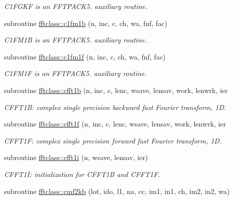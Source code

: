 \begin{DoxyCompactItemize}
\begin{DoxyCompactList}\small\item\em C1\+F\+G\+KF is an F\+F\+T\+P\+A\+C\+K5. auxiliary routine. \end{DoxyCompactList}\item 
subroutine \mbox{\hyperlink{namespacefftclass_a2f5368919279e1986ee34764caa05fe0}{fftclass\+::c1fm1b}} (n, inc, c, ch, wa, fnf, fac)
\begin{DoxyCompactList}\small\item\em C1\+F\+M1B is an F\+F\+T\+P\+A\+C\+K5. auxiliary routine. \end{DoxyCompactList}\item 
subroutine \mbox{\hyperlink{namespacefftclass_a8870afa6b2bab24460d719026aa6e0d8}{fftclass\+::c1fm1f}} (n, inc, c, ch, wa, fnf, fac)
\begin{DoxyCompactList}\small\item\em C1\+F\+M1F is an F\+F\+T\+P\+A\+C\+K5. auxiliary routine. \end{DoxyCompactList}\item 
subroutine \mbox{\hyperlink{namespacefftclass_ad484b97b5f8fc5ab868f25d7be0de7f8}{fftclass\+::cfft1b}} (n, inc, c, lenc, wsave, lensav, work, lenwrk, ier
\begin{DoxyCompactList}\small\item\em C\+F\+F\+T1B\+: complex single precision backward fast Fourier transform, 1D. \end{DoxyCompactList}\item 
subroutine \mbox{\hyperlink{namespacefftclass_a8ecbd8fa5a63e3cef089dbe7e91c6438}{fftclass\+::cfft1f}} (n, inc, c, lenc, wsave, lensav, work, lenwrk, ier
\begin{DoxyCompactList}\small\item\em C\+F\+F\+T1F\+: complex single precision forward fast Fourier transform, 1D. \end{DoxyCompactList}\item 
subroutine \mbox{\hyperlink{namespacefftclass_a7aaa42c1b45fc7175f2560cd023e4487}{fftclass\+::cfft1i}} (n, wsave, lensav, ier)
\begin{DoxyCompactList}\small\item\em C\+F\+F\+T1I\+: initialization for C\+F\+F\+T1B and C\+F\+F\+T1F. \end{DoxyCompactList}\item 
subroutine \mbox{\hyperlink{namespacefftclass_a718a5d0ac7052a9bcbcb9db18430dd61}{fftclass\+::cmf2kb}} (lot, ido, l1, na, cc, im1, in1, ch, im2, in2, wa)

\end{DoxyCompactItemize}
